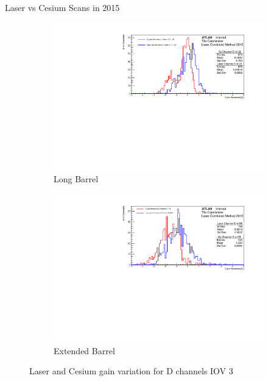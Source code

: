 \documentclass{beamer}
\begin{document}
\begin{frame}{Laser vs Cesium Scans in 2015}
\begin{figure}[H]
\centering
\begin{subfigure} [t] {0.49\textwidth}
\includegraphics[width=\textwidth]{cs1d_d_lb_iov3.pdf}
\caption{Long Barrel}
\end{subfigure}
\begin{subfigure} [t] {0.49\textwidth}
\includegraphics[width=\textwidth]{cs1d_d_eb_iov3.pdf}
\caption{Extended Barrel}
\end{subfigure}
\caption{Laser and Cesium gain variation for D channels IOV 3}
\end{figure}
\end{frame}
\end{document}
